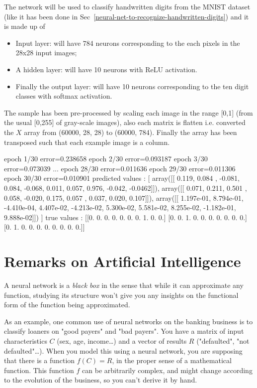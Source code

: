 The network will be used to classify handwritten digits from the MNIST dataset (like it has been done in Sec~\ref{neural-net-to-recognize-handwritten-digits}) and it is made up of
\begin{itemize}
	\item Input layer: will have 784 neurons corresponding to the each pixels in the 28x28 input images;
	\item A hidden layer: will have 10 neurons with ReLU activation.
	\item Finally the output layer: will have 10 neurons corresponding to the ten digit classes with softmax activation.
\end{itemize}

The sample has been pre-processed by scaling each image in the range [0,1] (from the usual [0,255] of gray-scale images), also each matrix is flatten i.e. converted the $X$ array from (60000, 28, 28) to (60000, 784). Finally the array has been transposed such that each example image is a column.


\begin{ioutput}
epoch 1/30   error=0.238658
epoch 2/30   error=0.093187
epoch 3/30   error=0.073039
...
epoch 28/30   error=0.011636
epoch 29/30   error=0.011306
epoch 30/30   error=0.010901
predicted values : 
[
array([[ 0.119,  0.084 , -0.081,  0.084, -0.068, 
         0.011,  0.057,  0.976, -0.042, -0.0462]]),
array([[ 0.071,  0.211,  0.501 ,  0.058, -0.020, 
         0.175,  0.057 ,  0.037,  0.020,  0.107]]),
array([[ 1.197e-01,  8.794e-01, -4.410e-04, 4.407e-02, -4.213e-02,  
         5.300e-02, 5.581e-02,  8.255e-02, -1.182e-01, 9.888e-02]])
]
true values : 
[[0. 0. 0. 0. 0. 0. 0. 1. 0. 0.]
 [0. 0. 1. 0. 0. 0. 0. 0. 0. 0.]
 [0. 1. 0. 0. 0. 0. 0. 0. 0. 0.]]
\end{ioutput}

\section{Remarks on Artificial Intelligence}

A neural network is a \emph{black box} in the sense that while it can approximate any function, studying its structure won't give you any insights on the functional form of the function being approximated.

As an example, one common use of neural networks on the banking business is to classify loaners on "good payers" and "bad payers". You have a matrix of input characteristics $C$ (sex, age, income\ldots) and a vector of results $R$ ("defaulted", "not defaulted"\ldots). When you model this using a neural network, you are supposing that there is a function $f(C)=R$, in the proper sense of a mathematical function. This function $f$ can be arbitrarily complex, and might change according to the evolution of the business, so you can't derive it by hand.

